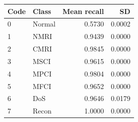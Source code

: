 \begin{tabular}{llrr}
\toprule
Code & Class & Mean recall & SD \\
\midrule
0 & Normal & 0.5730 & 0.0002 \\
1 & NMRI & 0.9439 & 0.0000 \\
2 & CMRI & 0.9845 & 0.0000 \\
3 & MSCI & 0.9615 & 0.0000 \\
4 & MPCI & 0.9804 & 0.0000 \\
5 & MFCI & 0.9652 & 0.0000 \\
6 & DoS & 0.9646 & 0.0179 \\
7 & Recon & 1.0000 & 0.0000 \\
\bottomrule
\end{tabular}
